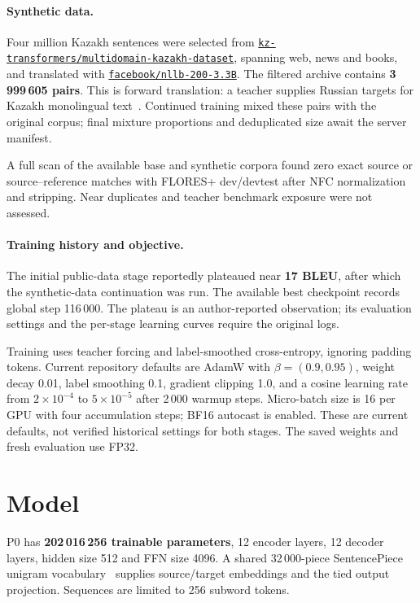 \documentclass{article}
\begin{document}
\paragraph{Synthetic data.}
Four million Kazakh sentences were selected from
\href{https://huggingface.co/datasets/kz-transformers/multidomain-kazakh-dataset}{\texttt{kz-transformers/multidomain-kazakh-dataset}},
spanning web, news and books, and translated with
\href{https://huggingface.co/facebook/nllb-200-3.3B}{\texttt{facebook/nllb-200-3.3B}}.
The filtered archive contains \textbf{3\,999\,605 pairs}. This is forward
translation: a teacher supplies Russian targets for Kazakh monolingual
text~\cite{distillation}. Continued training mixed these pairs with the
original corpus; final mixture proportions and deduplicated size await
the server manifest.

A full scan of the available base and synthetic corpora found zero exact
source or source--reference matches with FLORES+ dev/devtest after NFC
normalization and stripping. Near duplicates and teacher benchmark exposure
were not assessed.

\paragraph{Training history and objective.}
The initial public-data stage reportedly plateaued near \textbf{17 BLEU},
after which the synthetic-data continuation was run. The available best
checkpoint records global step 116\,000. The plateau is an author-reported
observation; its evaluation settings and the per-stage learning curves
require the original logs.

Training uses teacher forcing and label-smoothed cross-entropy, ignoring
padding tokens. Current repository defaults are AdamW with
$\beta=(0.9,0.95)$, weight decay 0.01, label smoothing 0.1, gradient clipping
1.0, and a cosine learning rate from $2\times10^{-4}$ to $5\times10^{-5}$
after 2\,000 warmup steps. Micro-batch size is 16 per GPU with four
accumulation steps; BF16 autocast is enabled. These are current defaults,
not verified historical settings for both stages. The saved weights and
fresh evaluation use FP32.

\section{Model}
P0 has \textbf{202\,016\,256 trainable parameters}, 12 encoder layers,
12 decoder layers, hidden size 512 and FFN size 4096. A shared
32\,000-piece SentencePiece unigram vocabulary~\cite{sentencepiece}
supplies source/target embeddings and the tied output projection.
Sequences are limited to 256 subword tokens.
\end{document}
